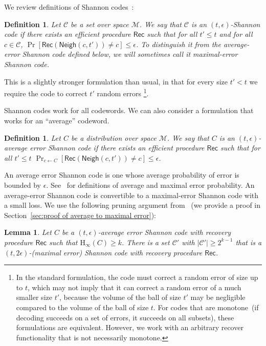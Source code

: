 \documentclass[11pt]{article}
\newcommand{\secref}[1]{\mbox{Section~\ref{#1}}}
\newcommand{\class}[1]{{\ensuremath{\mathsf{#1}}}}
\newcommand{\rec}{\ensuremath{\class{Rec}}\xspace}
\newcommand{\neigh}{\ensuremath{\class{Neigh}}\xspace}
\newcommand{\Hoo}{\mathrm{H}_\infty}
\newtheorem{lemma}[theorem]{Lemma}
\newtheorem{definition}[theorem]{Definition}
\begin{document}
We review definitions of Shannon codes~\cite{shannon1949mathematical}:
\begin{definition}
\label{def:shannon-code}
Let $\mathcal{C}$ be a set over space $\mathcal{M}$.  We say that $\mathcal{C}$ is an $(t,\epsilon)$-\emph{Shannon code} if there exists an efficient procedure $\rec$ such that for all $t'\le t$ and for all $c\in \mathcal{C}$, $\Pr[\rec(\neigh(c, t')) \neq c]\le \epsilon$. To distinguish it from the average-error Shannon code defined below, we will sometimes call it \emph{maximal-error} Shannon code.
\end{definition}
This is a slightly stronger formulation than usual, in that for every size  $t'<t$ we require the code to correct $t'$ random errors \footnote{In the standard formulation, the code must correct a random error of size up to $t$, which may not imply that it can correct a random error of a much smaller size $t'$, because the volume of the ball of size $t'$ may be negligible compared to the volume of the ball of size $t$.  For codes that are monotone~(if decoding succeeds on a set of errors, it succeeds on all subsets), these formulations are equivalent.  However, we work with an arbitrary recover functionality that is not necessarily monotone.}.  

Shannon codes work for all codewords. We can also consider a formulation that works for an ``average'' codeword. 

 \begin{definition}
Let $C$ be a distribution over space $\mathcal{M}$.  We say that $C$ is an $(t,\epsilon)$-\emph{average error Shannon code} if there exists an efficient procedure $\rec$ such that for all $t'\le t$
$\Pr_{c\leftarrow C}[\rec(\neigh(c, t')) \neq c]\le \epsilon$.
\end{definition}
An average error Shannon code is one whose average probability of error is bounded by $\epsilon$.  See~\cite[Pages 192-194]{cover2006elements} for definitions of average and maximal error probability.  An average-error Shannon code is convertible to a maximal-error Shannon code with a small loss.  We use the following pruning argument from~\cite[Pages 202-204]{cover2006elements} (we provide a proof in \secref{sec:proof of average to maximal error}):
\begin{lemma}
\label{lem:averageToMaximalError}
Let $C$ be a $(t, \epsilon)$-average error Shannon code with recovery procedure $\rec$ such that $\Hoo(C)\geq k$.  There is a set $\mathcal{C}'$ with $|\mathcal{C}'|\ge2^{k-1}$ that  is a $(t, 2\epsilon)$-(maximal error) Shannon code with recovery procedure $\rec$.
\end{lemma}
\end{document}
